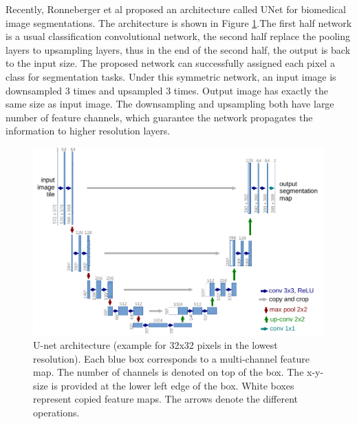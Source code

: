 Recently, Ronneberger et al proposed an architecture called UNet \cite{unet} for biomedical image segmentations. The architecture is shown in Figure \ref{fig:u-net}.The first half network is a usual classification convolutional network, the second half replace the pooling layers to upsampling layers, thus in the end of the second half, the output is back to the input size. The proposed network can successfully assigned each pixel a class for segmentation tasks. Under this symmetric network, an input image is downsampled 3 times and upsampled 3 times. Output image has exactly the same size as input image. The downsampling and upsampling both have large number of feature channels, which guarantee the network propagates the information to higher resolution layers.


\begin{figure}[!h]
	\centering
	\includegraphics[width=\textwidth]{./ref/u-net-illustration-correct-scale2}
	\caption{U-net architecture (example for 32x32 pixels in the lowest resolution). Each blue box corresponds to a multi-channel feature map. The number of channels is denoted on top of the box. The x-y-size is provided at the lower left edge of the box. White boxes represent copied feature maps. The arrows denote the different operations.
	}
	\label{fig:u-net}
\end{figure}











